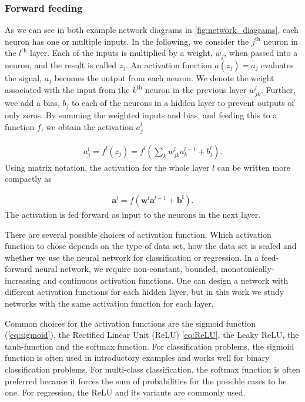 \documentclass[../main.tex]{subfiles}
\begin{document}
\subsubsection{Forward feeding}
As we can see in both example network diagrams in \cref{fig:network_diagrams}, each neuron has one or multiple inputs. In the following, we consider the $j^{\text{th}}$ neuron in the $l^{\text{th}}$ layer. Each of the inputs is multiplied by a weight, $w_j$, when passed into a neuron, and the result is called $z_j$. An activation function \ensuremath{a(z_j)=a_j} evaluates the signal, $a_j$ becomes the output from each neuron. We denote the weight associated with the input from the $k^{\text{th}}$ neuron in the previous layer $w_{jk}^l$. Further, wee add a bias, $b_j$ to each of the neurons in a hidden layer to prevent outputs of only zeros. By summing the weighted inputs and bias, and feeding this to a function $f$, we obtain the activation $a_j^l$


\begin{align*}
    a_j^l=f^l(z_j)=f^l\left(\sum_kw_{jk}^la_k^{l-1}+b_j^l\right).
\end{align*} Using matrix notation, the activation for the whole layer $l$ can be written more compactly as

\begin{align}
    \mathbf{a}^l=f(\mathbf{w}^l\mathbf{a}^{l-1}+\mathbf{b^l}).
\end{align} The activation is fed forward as input to the neurons in the next layer. 

There are several possible choices of activation function. Which activation function to chose depends on the type of data set, how the data set is scaled and whether we use the neural network for classification or regression. In a feed-forward neural network, we require non-constant, bounded, monotonically-increasing and continuous activation functions. One can design a network with different activation functions for each hidden layer, but in this work we study networks with the same activation function for each layer.  

Common choices for the activation functions are the sigmoid function (\cref{eq:sigmoid}), the Rectified Linear Unit (ReLU) \cref{eq:ReLU}, the Leaky ReLU, the tanh-function and the softmax function. For classification problems, the sigmoid function is often used in introductory examples and works well for binary classification problems. For multi-class classification, the softmax function is often preferred because it forces the sum of probabilities for the possible cases to be one. For regression, the ReLU and its variants are commonly used. 
\end{document}
